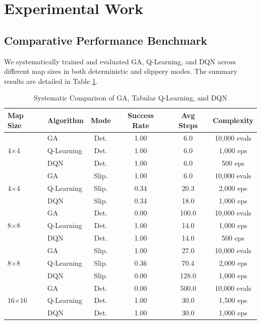 \documentclass[conference]{IEEEtran}
\begin{document}
\section{Experimental Work}

\subsection{Comparative Performance Benchmark}
We systematically trained and evaluated GA, Q-Learning, and DQN across different map sizes in both deterministic and slippery modes. The summary results are detailed in Table \ref{tab:comparison}.

\begin{table}[htbp]
\caption{Systematic Comparison of GA, Tabular Q-Learning, and DQN}
\label{tab:comparison}
\begin{center}
\begin{tabular}{|l|l|c|c|c|c|}
\hline
\textbf{Map Size} & \textbf{Algorithm} & \textbf{Mode} & \textbf{Success Rate} & \textbf{Avg Steps} & \textbf{Complexity} \\
\hline
\multirow{3}{*}{4$\times$4} & GA & Det. & 1.00 & 6.0 & 10,000 evals \\
& Q-Learning & Det. & 1.00 & 6.0 & 1,000 eps \\
& DQN & Det. & 1.00 & 6.0 & 500 eps \\
\hline
\multirow{3}{*}{4$\times$4} & GA & Slip. & 1.00 & 6.0 & 10,000 evals \\
& Q-Learning & Slip. & 0.34 & 20.3 & 2,000 eps \\
& DQN & Slip. & 0.34 & 18.0 & 1,000 eps \\
\hline
\multirow{3}{*}{8$\times$8} & GA & Det. & 0.00 & 100.0 & 10,000 evals \\
& Q-Learning & Det. & 1.00 & 14.0 & 1,000 eps \\
& DQN & Det. & 1.00 & 14.0 & 500 eps \\
\hline
\multirow{3}{*}{8$\times$8} & GA & Slip. & 1.00 & 27.0 & 10,000 evals \\
& Q-Learning & Slip. & 0.36 & 70.4 & 2,000 eps \\
& DQN & Slip. & 0.00 & 128.0 & 1,000 eps \\
\hline
\multirow{3}{*}{16$\times$16} & GA & Det. & 0.00 & 500.0 & 10,000 evals \\
& Q-Learning & Det. & 1.00 & 30.0 & 1,500 eps \\
& DQN & Det. & 1.00 & 30.0 & 1,000 eps \\

\end{tabular}
\end{center}
\end{table}
\end{document}
